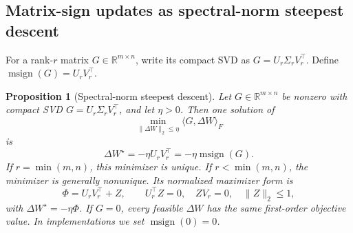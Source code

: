 \documentclass[sigconf,nonacm]{acmart}
\newtheorem{proposition}{Proposition}
\begin{document}
\subsection{Matrix-sign updates as spectral-norm steepest descent}
For a rank-$r$ matrix $G\in\mathbb{R}^{m\times n}$, write its compact SVD as $G=U_r\Sigma_rV_r^\top$. Define $\operatorname{msign}(G)=U_rV_r^\top$.

\begin{proposition}[Spectral-norm steepest descent]\label{prop:msign}
Let $G\in\mathbb{R}^{m\times n}$ be nonzero with compact SVD $G=U_r\Sigma_rV_r^\top$, and let $\eta>0$. Then one solution of
\begin{equation}
  \min_{\|\Delta W\|_2\leq \eta}\langle G,\Delta W\rangle_F
\end{equation}
is
\begin{equation}
  \Delta W^\star=-\eta U_rV_r^\top=-\eta\operatorname{msign}(G).
\end{equation}
If $r=\min(m,n)$, this minimizer is unique. If $r<\min(m,n)$, the minimizer is generally nonunique. Its normalized maximizer form is
\begin{equation}\label{eq:msign_solution_set}
  \Phi=U_rV_r^\top+Z,
  \qquad U_r^\top Z=0,\quad ZV_r=0,\quad \|Z\|_2\leq1,
\end{equation}
with $\Delta W^\star=-\eta\Phi$. If $G=0$, every feasible $\Delta W$ has the same first-order objective value. In implementations we set $\operatorname{msign}(0)=0$.
\end{proposition}
\end{document}
